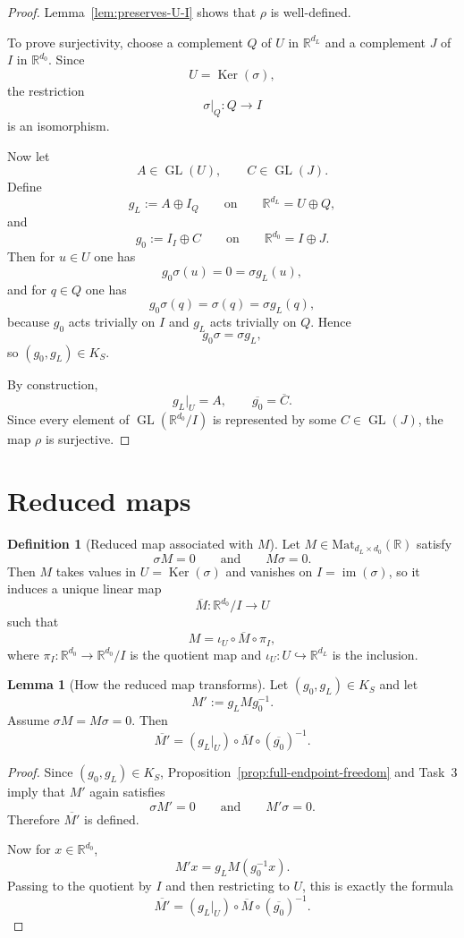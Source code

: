 \documentclass{article}
\newcommand{\GL}{\operatorname{GL}}
\newcommand{\R}{\mathbb{R}}
\newcommand{\Mat}{\mathrm{Mat}}
\newcommand{\im}{\operatorname{im}}
\newcommand{\Ker}{\operatorname{Ker}}
\theoremstyle{definition}
\newtheorem{lemma}[theorem]{Lemma}
\newtheorem{definition}[theorem]{Definition}
\begin{document}
\begin{proof}
Lemma~\ref{lem:preserves-U-I} shows that $\rho$ is well-defined.

To prove surjectivity, choose a complement $Q$ of $U$ in $\R^{d_L}$ and a complement $J$ of $I$ in $\R^{d_0}$. Since
\[
U=\Ker(\sigma),
\]
the restriction
\[
\sigma|_Q:Q\to I
\]
is an isomorphism.

Now let
\[
A\in \GL(U),
\qquad
C\in \GL(J).
\]
Define
\[
g_L:=A\oplus I_Q
\qquad\text{on}\qquad
\R^{d_L}=U\oplus Q,
\]
and
\[
g_0:=I_I\oplus C
\qquad\text{on}\qquad
\R^{d_0}=I\oplus J.
\]
Then for $u\in U$ one has
\[
g_0\sigma(u)=0=\sigma g_L(u),
\]
and for $q\in Q$ one has
\[
g_0\sigma(q)=\sigma(q)=\sigma g_L(q),
\]
because $g_0$ acts trivially on $I$ and $g_L$ acts trivially on $Q$. Hence
\[
g_0\sigma=\sigma g_L,
\]
so $(g_0,g_L)\in K_S$.

By construction,
\[
g_L|_U=A,
\qquad
\overline{g_0}=\overline{C}.
\]
Since every element of $\GL(\R^{d_0}/I)$ is represented by some $C\in \GL(J)$, the map $\rho$ is surjective.
\end{proof}

\section{Reduced maps}

\begin{definition}[Reduced map associated with $M$]\label{def:reduced-map}
Let $M\in \Mat_{d_L\times d_0}(\R)$ satisfy
\[
\sigma M=0
\qquad\text{and}\qquad
M\sigma=0.
\]
Then $M$ takes values in $U=\Ker(\sigma)$ and vanishes on $I=\im(\sigma)$, so it induces a unique linear map
\[
\overline M:\R^{d_0}/I\to U
\]
such that
\[
M=\iota_U\circ \overline M\circ \pi_I,
\]
where $\pi_I:\R^{d_0}\to \R^{d_0}/I$ is the quotient map and $\iota_U:U\hookrightarrow \R^{d_L}$ is the inclusion.
\end{definition}

\begin{lemma}[How the reduced map transforms]\label{lem:reduced-map-transform}
Let $(g_0,g_L)\in K_S$ and let
\[
M':=g_LMg_0^{-1}.
\]
Assume $\sigma M=M\sigma=0$. Then
\[
\overline{M'}=(g_L|_U)\circ \overline M\circ (\overline{g_0})^{-1}.
\]
\end{lemma}

\begin{proof}
Since $(g_0,g_L)\in K_S$, Proposition~\ref{prop:full-endpoint-freedom} and Task~3 imply that $M'$ again satisfies
\[
\sigma M'=0
\qquad\text{and}\qquad
M'\sigma=0.
\]
Therefore $\overline{M'}$ is defined.

Now for $x\in \R^{d_0}$,
\[
M'x=g_LM(g_0^{-1}x).
\]
Passing to the quotient by $I$ and then restricting to $U$, this is exactly the formula
\[
\overline{M'}=(g_L|_U)\circ \overline M\circ (\overline{g_0})^{-1}.
\]
\end{proof}
\end{document}
